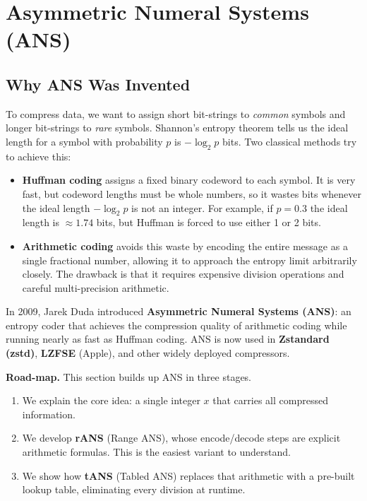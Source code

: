 
\section{Asymmetric Numeral Systems (ANS)}

\subsection{Why ANS Was Invented}

To compress data, we want to assign short bit-strings to
\emph{common} symbols and longer bit-strings to \emph{rare}
symbols.  Shannon's entropy theorem tells us the ideal length
for a symbol with probability $p$ is $-\log_2 p$ bits.  Two
classical methods try to achieve this:

\begin{itemize}[leftmargin=2em]
    \item \textbf{Huffman coding} assigns a fixed binary
          codeword to each symbol.  It is very fast, but
          codeword lengths must be whole numbers, so it wastes
          bits whenever the ideal length $-\log_2 p$ is not an
          integer.  For example, if $p = 0.3$ the ideal length
          is $\approx 1.74$ bits, but Huffman is forced to use
          either 1 or 2 bits.

    \item \textbf{Arithmetic coding} avoids this waste by
          encoding the entire message as a single fractional
          number, allowing it to approach the entropy limit
          arbitrarily closely.  The drawback is that it
          requires expensive division operations and careful
          multi-precision arithmetic.
\end{itemize}

\medskip
In 2009, Jarek Duda introduced \textbf{Asymmetric Numeral
Systems (ANS)}: an entropy coder that achieves the compression
quality of arithmetic coding while running nearly as fast as
Huffman coding.  ANS is now used in
\textbf{Zstandard (zstd)}, \textbf{LZFSE} (Apple), and other
widely deployed compressors.

\medskip
\textbf{Road-map.}  This section builds up ANS in three
stages.
\begin{enumerate}
  \item We explain the core idea: a single integer $x$ that
        carries all compressed information.
  \item We develop \textbf{rANS} (Range ANS), whose
        encode/decode steps are explicit arithmetic formulas.
        This is the easiest variant to understand.
  \item We show how \textbf{tANS} (Tabled ANS) replaces
        that arithmetic with a pre-built lookup table,
        eliminating every division at runtime.
\end{enumerate}

